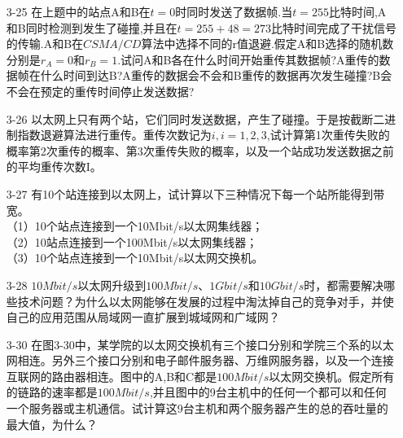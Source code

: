 \documentclass[a4paper,UTF8]{article}
\begin{document}
\begin{enumerate}
\item[3-25] 在上题中的站点A和B在$t=0$时同时发送了数据帧.当$t=255$比特时间,A和B同时检测到发生了碰撞,并且在$t=255+48=273$比特时间完成了干扰信号的传输.A和B在$CSMA/CD$算法中选择不同的r值退避.假定A和B选择的随机数分别是$r_A=0$和$r_B=1$.试问A和B各在什么时间开始重传其数据帧?A重传的数据帧在什么时间到达B?A重传的数据会不会和B重传的数据再次发生碰撞?B会不会在预定的重传时间停止发送数据?
\begin{solution}

\end{solution}

\item[3-26] 以太网上只有两个站，它们同时发送数据，产生了碰撞。于是按截断二进制指数退避算法进行重传。重传次数记为$i,i=1,2,3$,试计算第1次重传失败的概率第2次重传的概率、第3次重传失败的概率，以及一个站成功发送数据之前的平均重传次数I。 
\begin{solution}

\end{solution}

\item[3-27] 有10个站连接到以太网上，试计算以下三种情况下每一个站所能得到带宽。\\
（1）10个站点连接到一个10Mbit/s以太网集线器；\\
（2）10站点连接到一个100Mbit/s以太网集线器；\\
（3）10个站点连接到一个10Mbit/s以太网交换机。
\begin{solution}

\end{solution}

\item[3-28] $10Mbit/s$以太网升级到$100Mbit/s$、$1Gbit/s$和$10Gbit/s$时，都需要解决哪些技术问题？为什么以太网能够在发展的过程中淘汰掉自己的竞争对手，并使自己的应用范围从局域网一直扩展到城域网和广域网？
\begin{solution}

\end{solution}

\item[3-30] 在图3-30中，某学院的以太网交换机有三个接口分别和学院三个系的以太网相连。另外三个接口分别和电子邮件服务器、万维网服务器，以及一个连接互联网的路由器相连。图中的A,B和C都是$100Mbit/s$以太网交换机。假定所有的链路的速率都是$100Mbit/s$,并且图中的9台主机中的任何一个都可以和任何一个服务器或主机通信。试计算这9台主机和两个服务器产生的总的吞吐量的最大值，为什么？ 
\begin{solution}

\end{solution}


\end{enumerate}
\end{document}
